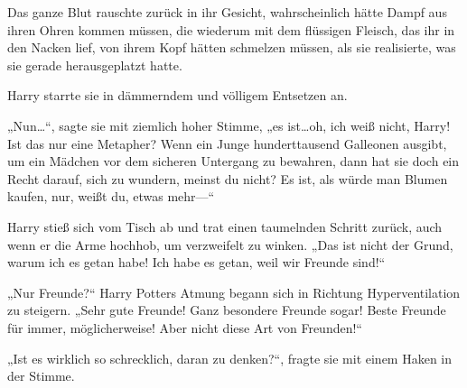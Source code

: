 Das ganze Blut rauschte zurück in ihr Gesicht, wahrscheinlich hätte Dampf aus ihren Ohren kommen müssen, die wiederum mit dem flüssigen Fleisch, das ihr in den Nacken lief, von ihrem Kopf hätten schmelzen müssen, als sie realisierte, was sie gerade herausgeplatzt hatte.

Harry starrte sie in dämmerndem und völligem Entsetzen an.

„Nun…“, sagte sie mit ziemlich hoher Stimme, „es ist…oh, ich weiß nicht, Harry! Ist das nur eine Metapher? Wenn ein Junge hunderttausend Galleonen ausgibt, um ein Mädchen vor dem sicheren Untergang zu bewahren, dann hat sie doch ein Recht darauf, sich zu wundern, meinst du nicht? Es ist, als würde man Blumen kaufen, nur, weißt du, etwas mehr—“

Harry stieß sich vom Tisch ab und trat einen taumelnden Schritt zurück, auch wenn er die Arme hochhob, um verzweifelt zu winken. „Das ist nicht der Grund, warum ich es getan habe! Ich habe es getan, weil wir Freunde sind!“

„Nur Freunde?“ Harry Potters Atmung begann sich in Richtung Hyperventilation zu steigern.
„Sehr gute Freunde! Ganz besondere Freunde sogar! Beste Freunde für immer, möglicherweise! Aber nicht diese Art von Freunden!“

„Ist es wirklich so schrecklich, daran zu denken?“, fragte sie mit einem Haken in der Stimme.

